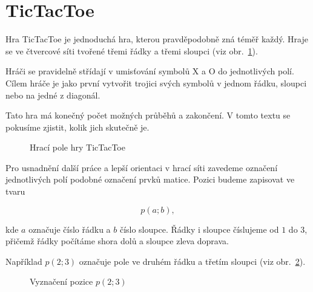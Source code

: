 \documentclass[12pt,a4paper]{article}
\begin{document}
\section*{TicTacToe}

Hra TicTacToe je jednoduchá hra, kterou pravděpodobně zná téměř každý.
Hraje se ve čtvercové síti tvořené třemi řádky a třemi sloupci
(viz obr.~\ref{fig:TicTacToeHraciPole}).

Hráči se pravidelně střídají v umisťování symbolů
$\mathrm{X}$ a $\mathrm{O}$ do jednotlivých polí.
Cílem hráče je jako první vytvořit trojici svých symbolů
v jednom řádku, sloupci nebo na jedné z diagonál.

Tato hra má konečný počet možných průběhů a zakončení.
V tomto textu se pokusíme zjistit, kolik jich skutečně je.

\begin{figure}[h]
    \centering

    \caption{Hrací pole hry TicTacToe}
    \label{fig:TicTacToeHraciPole}
\end{figure}

Pro usnadnění další práce a lepší orientaci v hrací síti zavedeme
označení jednotlivých polí podobné označení prvků matice.
Pozici budeme zapisovat ve tvaru

\begin{equation}
p(a;b),
\label{eq:OznaceniPozice}
\end{equation}

kde $a$ označuje číslo řádku a $b$ číslo sloupce.
Řádky i sloupce číslujeme od $1$ do $3$, přičemž řádky počítáme
shora dolů a sloupce zleva doprava.

Například $p(2;3)$ označuje pole ve druhém řádku a třetím sloupci
(viz obr.~\ref{fig:TicTacToeVyznaceniP23}).

\begin{figure}[h]
    \begin{center}

        \caption{Vyznačení pozice $p(2;3)$}
        \label{fig:TicTacToeVyznaceniP23}
    \end{center}
\end{figure}
\end{document}
